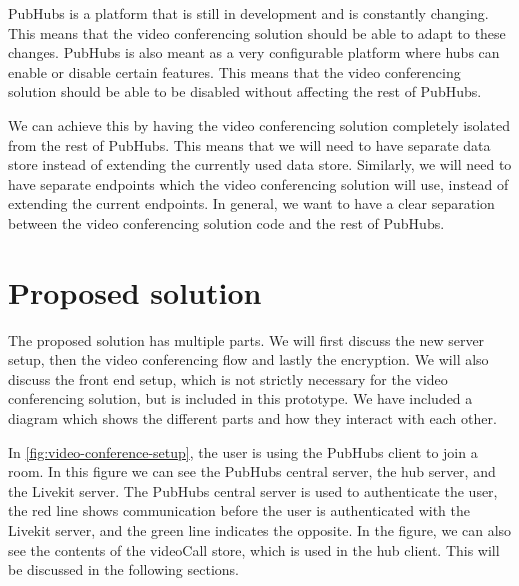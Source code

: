 \documentclass{report}
\begin{document}
PubHubs is a platform that is still in development and is constantly changing. This means that the video
conferencing solution should be able to adapt to these changes. PubHubs is also meant as a very configurable platform
where hubs can enable or disable certain features. This means that the video conferencing solution should be able to
be disabled without affecting the rest of PubHubs.

We can achieve this by having the video conferencing solution completely isolated from the rest of PubHubs.
This means that we will need to have separate data store instead of extending the currently used data store.
Similarly, we will need to have separate endpoints which the video conferencing solution will use,
instead of extending the current endpoints. In general, we want to have a clear separation between the video conferencing
solution code and the rest of PubHubs.

\chapter{Proposed solution}
The proposed solution has multiple parts. We will first discuss the new server setup, then the video conferencing flow
and lastly the encryption. We will also discuss the front end setup, which is not strictly necessary for the video
conferencing solution, but is included in this prototype. We have included a diagram which shows the different parts
and how they interact with each other.

In \autoref{fig:video-conference-setup}, the user is using the PubHubs client to join a room. In this figure we can see
the PubHubs central server, the hub server, and the Livekit server. The PubHubs central server is used to
authenticate the user, the red line shows communication before the user is authenticated with the Livekit server, and
the green line indicates the opposite. In the figure, we can also see the contents of the videoCall store, which is
used in the hub client. This will be discussed in the following sections. 
\end{document}
